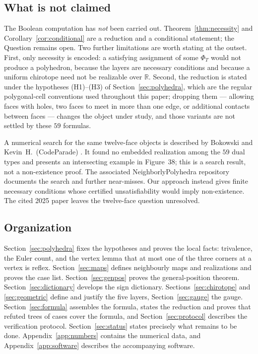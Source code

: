 \documentclass[11pt,reqno]{amsart}
\theoremstyle{plain}
\theoremstyle{definition}
\newcommand{\RR}{\mathbb{R}}
\begin{document}
\subsection{What is not claimed}\label{sub:notclaimed}
The Boolean computation has \emph{not} been carried out. Theorem~\ref{thm:necessity} and
Corollary~\ref{cor:conditional} are a reduction and a conditional statement; the Question remains
open. Two further limitations are worth stating at the outset. First, only necessity is encoded: a
satisfying assignment of some $\Phi_T$ would not produce a polyhedron, because the layers are
necessary conditions and because a uniform chirotope need not be realizable over $\RR$. Second, the
reduction is stated under the hypotheses (H1)--(H3) of Section~\ref{sec:polyhedra}, which are the
regular polygonal-cell conventions used throughout this paper; dropping them --- allowing faces with holes, two faces to
meet in more than one edge, or additional contacts between faces --- changes the object under study,
and those variants are not settled by these $59$ formulas.

A numerical search for the same twelve-face objects is described by Bokowski and
Kevin~H.\ (CodeParade) \cite[Sections~4 and~8.3]{BokowskiKevin2025}. It found no embedded
realization among the $59$ dual types and presents an intersecting example in Figure~38;
this is a search result, not a non-existence proof. The associated
\textsf{NeighborlyPolyhedra} repository \cite{HackerPoet} documents the search and further
near-misses. Our approach instead gives finite necessary conditions whose certified
unsatisfiability would imply non-existence. The cited 2025 paper leaves the twelve-face
question unresolved.

\subsection{Organization}
Section~\ref{sec:polyhedra} fixes the hypotheses and proves the local facts: trivalence, the Euler
count, and the vertex lemma that at most one of the three corners at a vertex is reflex.
Section~\ref{sec:maps} defines neighbourly maps and realizations and proves the case list.
Section~\ref{sec:genpos} proves the general-position theorem. Section~\ref{sec:dictionary} develops
the sign dictionary. Sections~\ref{sec:chirotope} and \ref{sec:geometric} define and justify the five
layers, Section~\ref{sec:gauge} the gauge. Section~\ref{sec:formula} assembles the formula, states the
reduction and proves that refuted trees of cases cover the formula, and Section~\ref{sec:protocol}
describes the verification protocol.
Section~\ref{sec:status} states precisely what remains to be done. Appendix~\ref{app:numbers} contains
the numerical data, and
Appendix~\ref{app:software} describes the accompanying software.
\end{document}
